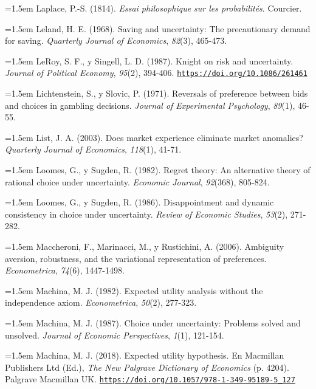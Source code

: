 \documentclass[10pt,a4paper]{article}
\begin{document}
\noindent\hangindent=1.5em Laplace, P.-S. (1814). \textit{Essai philosophique sur les probabilités}. Courcier.

\noindent\hangindent=1.5em Leland, H. E. (1968). Saving and uncertainty: The precautionary demand for saving. \textit{Quarterly Journal of Economics}, \textit{82}(3), 465-473.

\noindent\hangindent=1.5em LeRoy, S. F., y Singell, L. D. (1987). Knight on risk and uncertainty. \textit{Journal of Political Economy}, \textit{95}(2), 394-406. \href{https://doi.org/10.1086/261461}{\nolinkurl{https://doi.org/10.1086/261461}}

\noindent\hangindent=1.5em Lichtenstein, S., y Slovic, P. (1971). Reversals of preference between bids and choices in gambling decisions. \textit{Journal of Experimental Psychology}, \textit{89}(1), 46-55.

\noindent\hangindent=1.5em List, J. A. (2003). Does market experience eliminate market anomalies? \textit{Quarterly Journal of Economics}, \textit{118}(1), 41-71.

\noindent\hangindent=1.5em Loomes, G., y Sugden, R. (1982). Regret theory: An alternative theory of rational choice under uncertainty. \textit{Economic Journal}, \textit{92}(368), 805-824.

\noindent\hangindent=1.5em Loomes, G., y Sugden, R. (1986). Disappointment and dynamic consistency in choice under uncertainty. \textit{Review of Economic Studies}, \textit{53}(2), 271-282.

\noindent\hangindent=1.5em Maccheroni, F., Marinacci, M., y Rustichini, A. (2006). Ambiguity aversion, robustness, and the variational representation of preferences. \textit{Econometrica}, \textit{74}(6), 1447-1498.

\noindent\hangindent=1.5em Machina, M. J. (1982). Expected utility analysis without the independence axiom. \textit{Econometrica}, \textit{50}(2), 277-323.

\noindent\hangindent=1.5em Machina, M. J. (1987). Choice under uncertainty: Problems solved and unsolved. \textit{Journal of Economic Perspectives}, \textit{1}(1), 121-154.

\noindent\hangindent=1.5em Machina, M. J. (2018). Expected utility hypothesis. En Macmillan Publishers Ltd (Ed.), \textit{The New Palgrave Dictionary of Economics} (p. 4204). Palgrave Macmillan UK. \href{https://doi.org/10.1057/978-1-349-95189-5_127}{\nolinkurl{https://doi.org/10.1057/978-1-349-95189-5_127}}
\end{document}
